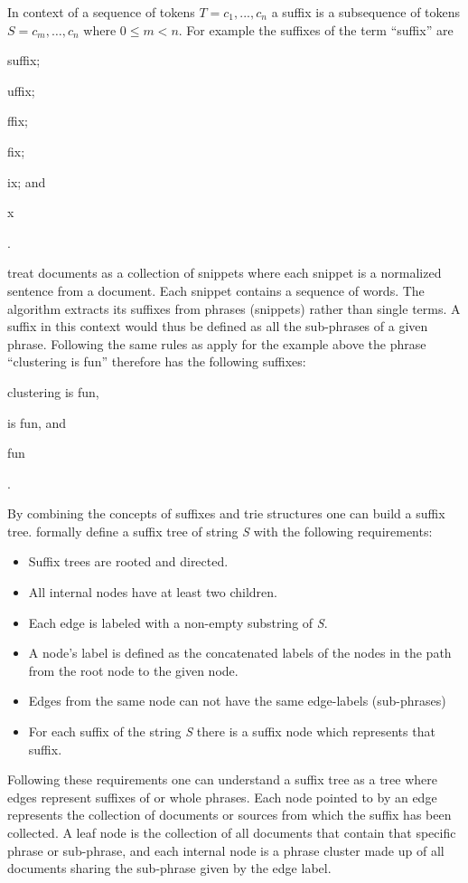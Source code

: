 In context of a sequence of tokens \(T = c_{1}, ..., c_{n}\) a suffix is a subsequence of tokens \(S = c_{m}, \dots, c_{n}\) where \(0 \le m < n\). For example the suffixes of the term ``suffix'' are
\begin{inparaenum}[\itshape 1\upshape)]
\item suffix;
\item uffix;
\item ffix;
\item fix;
\item ix; and
\item x
\end{inparaenum}.

\cite{Oren1998} treat documents as a collection of snippets where each snippet is a normalized sentence from a document. Each snippet contains a sequence of words. The \STC algorithm extracts its suffixes from phrases (snippets) rather than single terms. A suffix in this context would thus be defined as all the sub-phrases of a given phrase. Following the same rules as apply for the example above the phrase ``clustering is fun'' therefore has the following suffixes:
\begin{inparaenum}[\itshape 1\upshape)]
\item clustering is fun,
\item is fun, and
\item fun
\end{inparaenum}.

By combining the concepts of suffixes and trie structures one can build a suffix tree. \cite{Oren1998} formally define a suffix tree of string \textit{S} with the following requirements:
\begin{itemize}
\item Suffix trees are rooted and directed.
\item All internal nodes have at least two children.
\item Each edge is labeled with a non-empty substring of \textit{S}.
\item A node's label is defined as the concatenated labels of the nodes in the path from the root node to the given node.
\item Edges from the same node can not have the same edge-labels (sub-phrases)
\item For each suffix of the string \textit{S} there is a suffix node which represents that suffix.
\end{itemize}

Following these requirements one can understand a suffix tree as a tree where edges represent suffixes of or whole phrases. Each node pointed to by an edge represents the collection of documents or sources from which the suffix has been collected. A leaf node is the collection of all documents that contain that specific phrase or sub-phrase, and each internal node is a phrase cluster made up of all documents sharing the sub-phrase given by the edge label.

